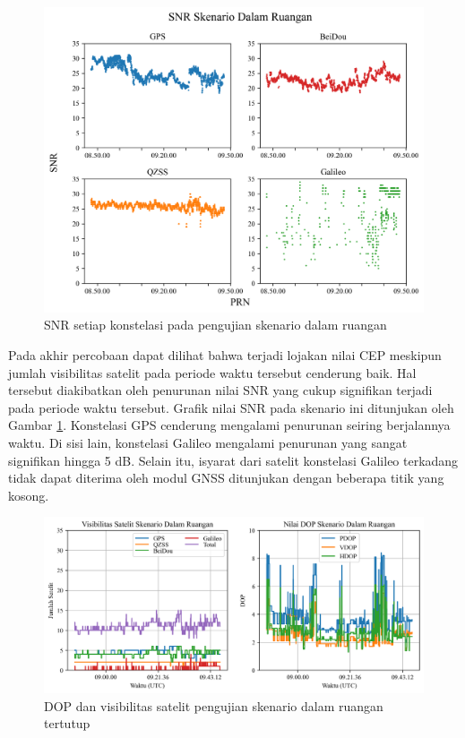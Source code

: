 \begin{figure}[H]
	\centering
	\includegraphics[width=13cm]{contents/chapter-4/2-skenario-indoor/snr.png}
	\caption{SNR setiap konstelasi pada pengujian skenario dalam ruangan}
	\label{Fig: indoor-snr}
\end{figure}

Pada akhir percobaan dapat dilihat bahwa terjadi lojakan nilai CEP meskipun jumlah visibilitas satelit pada periode waktu tersebut cenderung baik. Hal tersebut diakibatkan oleh penurunan nilai SNR yang cukup signifikan terjadi pada periode waktu tersebut. Grafik nilai SNR pada skenario ini ditunjukan oleh Gambar \ref{Fig: indoor-snr}. Konstelasi GPS cenderung mengalami penurunan seiring berjalannya waktu. Di sisi lain, konstelasi Galileo mengalami penurunan yang sangat signifikan hingga 5 dB. Selain itu, isyarat dari satelit konstelasi Galileo terkadang tidak dapat diterima oleh modul GNSS ditunjukan dengan beberapa titik yang kosong.

\begin{figure}[H]
	\centering
	\captionsetup{justification=centering}
	\begin{adjustbox}{width=\textwidth}
		\includegraphics{contents/chapter-4/2-skenario-indoor/sats_dop.png}
	\end{adjustbox}
	\caption{DOP dan visibilitas satelit pengujian skenario dalam ruangan tertutup}
	\label{Fig: indoor-sats_dop}
\end{figure}


